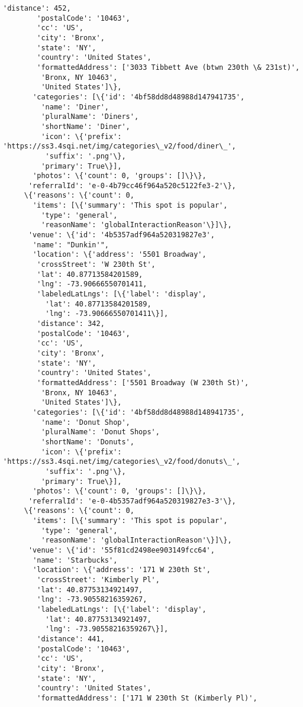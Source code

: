 \documentclass[11pt]{article}
\begin{document}
\begin{tcolorbox}[breakable, size=fbox, boxrule=.5pt, pad at break*=1mm, opacityfill=0]
\begin{Verbatim}[commandchars=\\\{\}]
        'distance': 452,
        'postalCode': '10463',
        'cc': 'US',
        'city': 'Bronx',
        'state': 'NY',
        'country': 'United States',
        'formattedAddress': ['3033 Tibbett Ave (btwn 230th \& 231st)',
         'Bronx, NY 10463',
         'United States']\},
       'categories': [\{'id': '4bf58dd8d48988d147941735',
         'name': 'Diner',
         'pluralName': 'Diners',
         'shortName': 'Diner',
         'icon': \{'prefix':
'https://ss3.4sqi.net/img/categories\_v2/food/diner\_',
          'suffix': '.png'\},
         'primary': True\}],
       'photos': \{'count': 0, 'groups': []\}\},
      'referralId': 'e-0-4b79cc46f964a520c5122fe3-2'\},
     \{'reasons': \{'count': 0,
       'items': [\{'summary': 'This spot is popular',
         'type': 'general',
         'reasonName': 'globalInteractionReason'\}]\},
      'venue': \{'id': '4b5357adf964a520319827e3',
       'name': "Dunkin'",
       'location': \{'address': '5501 Broadway',
        'crossStreet': 'W 230th St',
        'lat': 40.87713584201589,
        'lng': -73.90666550701411,
        'labeledLatLngs': [\{'label': 'display',
          'lat': 40.87713584201589,
          'lng': -73.90666550701411\}],
        'distance': 342,
        'postalCode': '10463',
        'cc': 'US',
        'city': 'Bronx',
        'state': 'NY',
        'country': 'United States',
        'formattedAddress': ['5501 Broadway (W 230th St)',
         'Bronx, NY 10463',
         'United States']\},
       'categories': [\{'id': '4bf58dd8d48988d148941735',
         'name': 'Donut Shop',
         'pluralName': 'Donut Shops',
         'shortName': 'Donuts',
         'icon': \{'prefix':
'https://ss3.4sqi.net/img/categories\_v2/food/donuts\_',
          'suffix': '.png'\},
         'primary': True\}],
       'photos': \{'count': 0, 'groups': []\}\},
      'referralId': 'e-0-4b5357adf964a520319827e3-3'\},
     \{'reasons': \{'count': 0,
       'items': [\{'summary': 'This spot is popular',
         'type': 'general',
         'reasonName': 'globalInteractionReason'\}]\},
      'venue': \{'id': '55f81cd2498ee903149fcc64',
       'name': 'Starbucks',
       'location': \{'address': '171 W 230th St',
        'crossStreet': 'Kimberly Pl',
        'lat': 40.87753134921497,
        'lng': -73.90558216359267,
        'labeledLatLngs': [\{'label': 'display',
          'lat': 40.87753134921497,
          'lng': -73.90558216359267\}],
        'distance': 441,
        'postalCode': '10463',
        'cc': 'US',
        'city': 'Bronx',
        'state': 'NY',
        'country': 'United States',
        'formattedAddress': ['171 W 230th St (Kimberly Pl)',

\end{Verbatim}
\end{tcolorbox}
\end{document}

